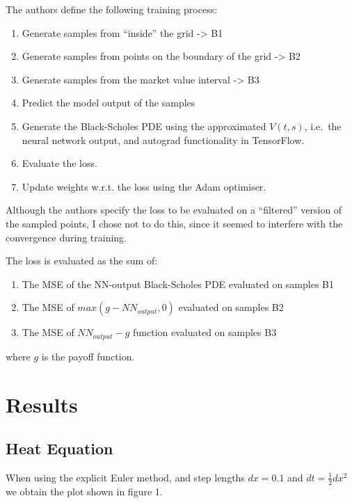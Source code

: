 \documentclass[]{article}
\providecommand{\tightlist}{%
  \setlength{\itemsep}{0pt}\setlength{\parskip}{0pt}}
\begin{document}
The authors define the following training process:

\begin{enumerate}
\def\labelenumi{\arabic{enumi}.}
\tightlist
\item
  Generate samples from ``inside'' the grid -\textgreater{} B1
\item
  Generate samples from points on the boundary of the grid
  -\textgreater{} B2
\item
  Generate samples from the market value interval -\textgreater{} B3
\item
  Predict the model output of the samples
\item
  Generate the Black-Scholes PDE using the approximated \(V(t, s)\),
  i.e.~the neural network output, and autograd functionality in
  TensorFlow.
\item
  Evaluate the loss.
\item
  Update weights w.r.t. the loss using the Adam optimiser.
\end{enumerate}

Although the authors specify the loss to be evaluated on a ``filtered''
version of the sampled points, I chose not to do this, since it seemed
to interfere with the convergence during training.

The loss is evaluated as the sum of:

\begin{enumerate}
\def\labelenumi{\arabic{enumi}.}
\tightlist
\item
  The MSE of the NN-output Black-Scholes PDE evaluated on samples B1
\item
  The MSE of \(max(g - NN_{output}, 0)\) evaluated on samples B2
\item
  The MSE of \(NN_{output} - g\) function evaluated on samples B3
\end{enumerate}

where \(g\) is the payoff function.

\section{Results}\label{results}

\subsection{Heat Equation}\label{heat-equation}

When using the explicit Euler method, and step lengths \(dx=0.1\) and
\(dt=\frac{1}{2}{dx^2}\) we obtain the plot shown in figure 1.
\end{document}
